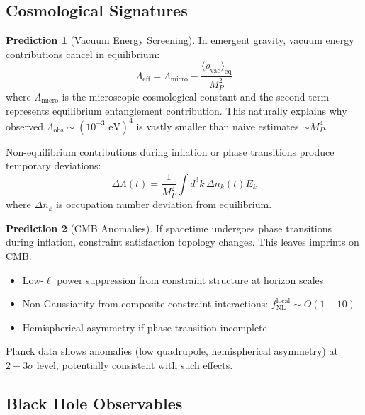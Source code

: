\documentclass[11pt,a4paper]{article}
\theoremstyle{remark}
\theoremstyle{definition}
\newtheorem{prediction}{Prediction}[section]
\begin{document}
\subsection{Cosmological Signatures}

\begin{prediction}[Vacuum Energy Screening]
In emergent gravity, vacuum energy contributions cancel in equilibrium:
\begin{equation}
\Lambda_{\text{eff}} = \Lambda_{\text{micro}} - \frac{\langle \rho_{\text{vac}} \rangle_{\text{eq}}}{M_P^2}
\end{equation}
where $\Lambda_{\text{micro}}$ is the microscopic cosmological constant and the second term represents equilibrium entanglement contribution. This naturally explains why observed $\Lambda_{\text{obs}} \sim (10^{-3} \text{ eV})^4$ is vastly smaller than naive estimates $\sim M_P^4$.

Non-equilibrium contributions during inflation or phase transitions produce temporary deviations:
\begin{equation}
\Delta\Lambda(t) = \frac{1}{M_P^2}\int d^3k \, \Delta n_k(t) E_k
\end{equation}
where $\Delta n_k$ is occupation number deviation from equilibrium.
\end{prediction}

\begin{prediction}[CMB Anomalies]
If spacetime undergoes phase transitions during inflation, constraint satisfaction topology changes. This leaves imprints on CMB:
\begin{itemize}
\item Low-$\ell$ power suppression from constraint structure at horizon scales
\item Non-Gaussianity from composite constraint interactions: $f_{\text{NL}}^{\text{local}} \sim O(1-10)$
\item Hemispherical asymmetry if phase transition incomplete
\end{itemize}
Planck data shows anomalies (low quadrupole, hemispherical asymmetry) at $2-3\sigma$ level, potentially consistent with such effects.
\end{prediction}

\subsection{Black Hole Observables}
\end{document}

